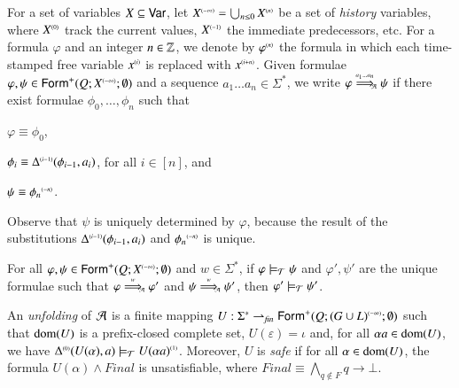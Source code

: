 \documentclass{llncs}
\begin{document}
For a set of variables $X \subseteq \mathsf{Var}$, let ${X}^{\scriptscriptstyle{({-\infty})}} =
\bigcup_{n\leq0} {X}^{\scriptscriptstyle{({n})}}$ be a set of \emph{history} variables,
where ${X}^{\scriptscriptstyle{({0})}}$ track the current values, ${X}^{\scriptscriptstyle{({-1})}}$ the
immediate predecessors, etc. For a formula $\varphi$ and an integer $n
\in {\bf \mathbb{Z}}$, we denote by ${\varphi}^{\scriptscriptstyle{({n})}}$ the formula in which each
time-stamped free variable ${x}^{\scriptscriptstyle{({i})}}$ is replaced with
${x}^{\scriptscriptstyle{({i+n})}}$. Given formulae $\varphi,\psi \in
\mathsf{Form}^+(Q;{X}^{\scriptscriptstyle{({-\infty})}}; \emptyset)$ and a sequence $a_1 \ldots
a_n \in \Sigma^*$, we write $\varphi \stackrel{\scriptscriptstyle a_1 \ldots a_n}{\Longrightarrow}_{\!\!\scriptscriptstyle \mathcal{A}} \psi$
if there exist formulae $\phi_0, \ldots, \phi_n$ such
that\begin{inparaenum}[(i)]
\item $\varphi \equiv \phi_0$, 
\item $\phi_i \equiv {\Delta}^{\scriptscriptstyle{({i-1})}}(\phi_{i-1},a_i)$, for all $i
  \in [n]$, and
\item $\psi \equiv {\phi_n}^{\scriptscriptstyle{({-n})}}$. \end{inparaenum} Observe that
$\psi$ is uniquely determined by $\varphi$, because the result of the
substitutions ${\Delta}^{\scriptscriptstyle{({i-1})}}(\phi_{i-1},a_i)$ and
${\phi_n}^{\scriptscriptstyle{({-n})}}$ is unique.

\begin{proposition}\label{prop:monotonicity}
  For all $\varphi,\psi \in \mathsf{Form}^+(Q;{X}^{\scriptscriptstyle{({-\infty})}}; \emptyset)$
  and $w \in \Sigma^*$, if $\varphi \models_{\mathcal{T}} \psi$ and $\varphi',
  \psi'$ are the unique formulae such that $\varphi \stackrel{\scriptscriptstyle w}{\Longrightarrow}_{\!\!\scriptscriptstyle \mathcal{A}}
  \varphi'$ and $\psi \stackrel{\scriptscriptstyle w}{\Longrightarrow}_{\!\!\scriptscriptstyle \mathcal{A}} \psi'$, then $\varphi' \models_{\mathcal{T}}
  \psi'$.
\end{proposition}

\begin{definition}\label{def:unfolding}
An \emph{unfolding} of $\mathcal{A}$ is a finite mapping $U : \Sigma^*
\rightharpoonup_{\mathit{fin}} \mathsf{Form}^+(Q;{(G\cup L)}^{\scriptscriptstyle{({-\infty})}};
\emptyset)$ such that $\mathrm{dom}(U)$ is a prefix-closed complete set,
$U(\varepsilon) = \iota$ and, for all $\alpha a \in \mathrm{dom}(U)$, we have
${\Delta}^{\scriptscriptstyle{({0})}}(U(\alpha),a) \models_{\mathcal{T}} {U(\alpha a)}^{\scriptscriptstyle{({1})}}$.
Moreover, $U$ is \emph{safe} if for all $\alpha \in \mathrm{dom}(U)$, the
formula $U(\alpha) \wedge \mathit{Final}$ is unsatisfiable, where
$\mathit{Final} \equiv \bigwedge_{q \not\in F} q \rightarrow \bot$.
\end{definition}
\end{document}
